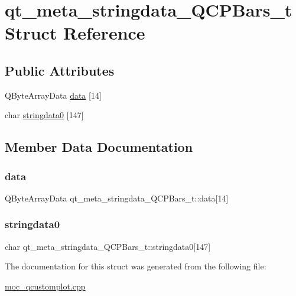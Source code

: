 \hypertarget{structqt__meta__stringdata__QCPBars__t}{}\section{qt\+\_\+meta\+\_\+stringdata\+\_\+\+Q\+C\+P\+Bars\+\_\+t Struct Reference}
\label{structqt__meta__stringdata__QCPBars__t}
\subsection*{Public Attributes}
\begin{DoxyCompactItemize}
\item 
Q\+Byte\+Array\+Data \mbox{\hyperlink{structqt__meta__stringdata__QCPBars__t_a40d7e47e2037dd5bb7c67e6397d92852}{data}} \mbox{[}14\mbox{]}
\item 
char \mbox{\hyperlink{structqt__meta__stringdata__QCPBars__t_ab1c5ceea0b404e0edfc8690c1a945309}{stringdata0}} \mbox{[}147\mbox{]}
\end{DoxyCompactItemize}


\subsection{Member Data Documentation}
\mbox{\label{structqt__meta__stringdata__QCPBars__t_a40d7e47e2037dd5bb7c67e6397d92852}} 
\subsubsection{\texorpdfstring{data}{data}}
{\footnotesize\ttfamily Q\+Byte\+Array\+Data qt\+\_\+meta\+\_\+stringdata\+\_\+\+Q\+C\+P\+Bars\+\_\+t\+::data\mbox{[}14\mbox{]}}

\mbox{\label{structqt__meta__stringdata__QCPBars__t_ab1c5ceea0b404e0edfc8690c1a945309}} 
\subsubsection{\texorpdfstring{stringdata0}{stringdata0}}
{\footnotesize\ttfamily char qt\+\_\+meta\+\_\+stringdata\+\_\+\+Q\+C\+P\+Bars\+\_\+t\+::stringdata0\mbox{[}147\mbox{]}}



The documentation for this struct was generated from the following file\+:\begin{DoxyCompactItemize}
\item 
\mbox{\hyperlink{moc__qcustomplot_8cpp}{moc\+\_\+qcustomplot.\+cpp}}\end{DoxyCompactItemize}
